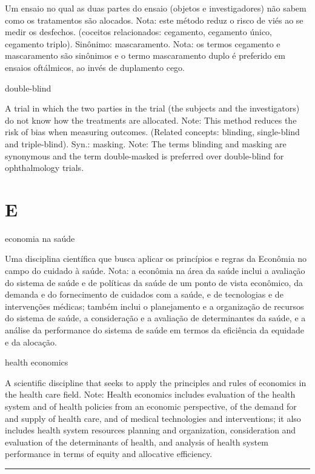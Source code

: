 \documentclass[
]{book}
\begin{document}
Um ensaio no qual as duas partes do ensaio (objetos e investigadores) não sabem como os tratamentos são alocados. Nota: este método reduz o risco de viés ao se medir os desfechos. (coceitos relacionados: cegamento, cegamento único, cegamento triplo). Sinônimo: mascaramento. Nota: os termos cegamento e mascaramento são sinônimos e o termo mascaramento duplo é preferido em ensaios oftálmicos, ao invés de duplamento cego.

double-blind

A trial in which the two parties in the trial (the subjects and the investigators) do not know how the treatments are allocated. Note: This method reduces the risk of bias when measuring outcomes. (Related concepts: blinding, single-blind and triple-blind). Syn.: masking. Note: The terms blinding and masking are synonymous and the term double-masked is preferred over double-blind for ophthalmology trials.

\hypertarget{e}{%
\chapter*{E}\label{e}}

economia na saúde

Uma disciplina científica que busca aplicar os princípios e regras da Econômia no campo do cuidado à saúde. Nota: a econômia na área da saúde inclui a avaliação do sistema de saúde e de políticas da saúde de um ponto de vista econômico, da demanda e do fornecimento de cuidados com a saúde, e de tecnologias e de intervenções médicas; também inclui o planejamento e a organização de recursos do sistema de saúde, a consideração e a avaliação de determinantes da saúde, e a análise da performance do sistema de saúde em termos da eficiência da equidade e da alocação.

health economics

A scientific discipline that seeks to apply the principles and rules of economics in the health care field. Note: Health economics includes evaluation of the health system and of health policies from an economic perspective, of the demand for and supply of health care, and of medical technologies and interventions; it also includes health system resources planning and organization, consideration and evaluation of the determinants of health, and analysis of health system performance in terms of equity and allocative efficiency.

\begin{center}\rule{0.5\linewidth}{0.5pt}\end{center}
\end{document}
